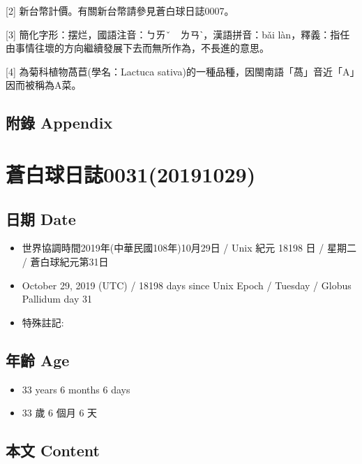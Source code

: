 \documentclass[a5paper, 12pt
]{book}
\providecommand{\tightlist}{%
  \setlength{\itemsep}{0pt}\setlength{\parskip}{0pt}}
\begin{document}
{[}2{]} 新台幣計價。有關新台幣請參見蒼白球日誌0007。

{[}3{]} 簡化字形：摆烂，國語注音：ㄅㄞˇ　ㄌㄢˋ，漢語拼音：bǎi
làn，釋義：指任由事情往壞的方向繼續發展下去而無所作為，不長進的意思。

{[}4{]} 為菊科植物萵苣(學名：Lactuca
sativa)的一種品種，因閩南語「萵」音近「A」因而被稱為A菜。

\hypertarget{ux9644ux9304-appendix-22}{%
\subsection{附錄 Appendix}\label{ux9644ux9304-appendix-22}}

\hypertarget{ux84bcux767dux7403ux65e5ux8a8c003120191029}{%
\section{蒼白球日誌0031(20191029)}\label{ux84bcux767dux7403ux65e5ux8a8c003120191029}}

\hypertarget{ux65e5ux671f-date-28}{%
\subsection{日期 Date}\label{ux65e5ux671f-date-28}}

\begin{itemize}
\tightlist
\item
  世界協調時間2019年(中華民國108年)10月29日 / Unix 紀元 18198 日 /
  星期二 / 蒼白球紀元第31日
\item
  October 29, 2019 (UTC) / 18198 days since Unix Epoch / Tuesday /
  Globus Pallidum day 31
\item
  特殊註記:
\end{itemize}

\hypertarget{ux5e74ux9f61-age-28}{%
\subsection{年齡 Age}\label{ux5e74ux9f61-age-28}}

\begin{itemize}
\tightlist
\item
  33 years 6 months 6 days
\item
  33 歲 6 個月 6 天
\end{itemize}

\hypertarget{ux672cux6587-content-28}{%
\subsection{本文 Content}\label{ux672cux6587-content-28}}
\end{document}
